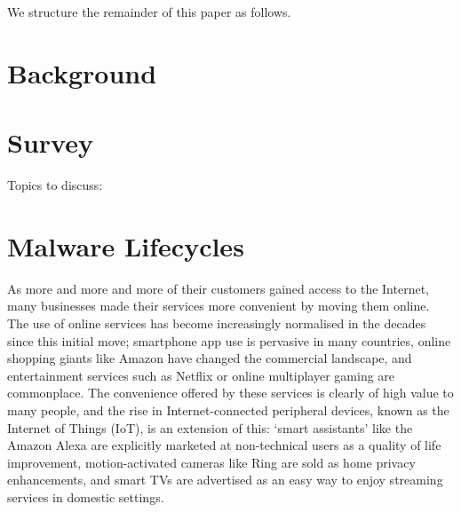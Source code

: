 \documentclass[10pt,sigconf]{acmart}
\begin{document}
We structure the remainder of this paper as follows.

%
%
%
\section{Background}


\section{Survey}

Topics to discuss:

\section{Malware Lifecycles}

As more and more and more of their customers gained access to the Internet, many businesses made their services more convenient by moving them online.
The use of online services has become increasingly normalised in the decades since this initial move;
smartphone app use is pervasive in many countries, online shopping giants like Amazon have changed the commercial landscape, and entertainment services such as Netflix or online multiplayer gaming are commonplace.
The convenience offered by these services is clearly of high value to many people, and the rise in Internet-connected peripheral devices, known as the Internet of Things (IoT), is an extension of this:
`smart assistants' like the Amazon Alexa are explicitly marketed at non-technical users as a quality of life improvement, motion-activated cameras like Ring are sold as home privacy enhancements, and smart TVs are advertised as an easy way to enjoy streaming services in domestic settings.
\end{document}
